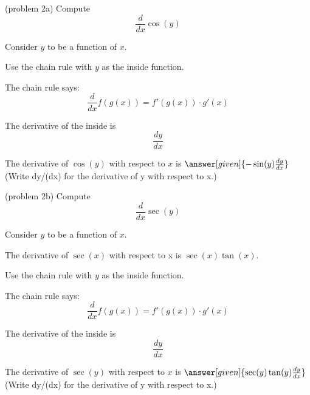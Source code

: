 \documentclass{ximera}
\begin{document}
\begin{problem}(problem 2a)
  Compute
  \[
  \frac{d}{dx} \cos(y)
  \]
  
	  
    \begin{hint}
      Consider $y$ to be a function of $x$.
    \end{hint}
    \begin{hint}
      Use the chain rule with $y$ as the inside function.
    \end{hint}
    \begin{hint}
      The chain rule says:
      \[
      \frac{d}{dx} f(g(x)) = f'(g(x))\cdot g'(x)
      \]
    \end{hint}
    \begin{hint}
      The derivative of the inside is 
      \[
      \frac{dy}{dx}
      \]
    \end{hint}
    
		The derivative of $\cos(y)$ with respect to $x$ is
		 $\answer[given]{-\sin(y) \frac{dy}{dx}}$ (Write dy/(dx) for the derivative of y with respect to x.)
		
\end{problem}

\begin{problem}(problem 2b)
  Compute
  \[
  \frac{d}{dx} \sec(y)
  \]
  
	  
    \begin{hint}
      Consider $y$ to be a function of $x$.
    \end{hint}
    \begin{hint}
     The derivative of $\sec(x)$ with respect to x is $\sec(x)\tan(x)$.
    \end{hint}
		\begin{hint}
      Use the chain rule with $y$ as the inside function.
    \end{hint}
    \begin{hint}
      The chain rule says:
      \[
      \frac{d}{dx} f(g(x)) = f'(g(x))\cdot g'(x)
      \]
    \end{hint}
    \begin{hint}
      The derivative of the inside is 
      \[
      \frac{dy}{dx}
      \]
    \end{hint}
    
		The derivative of $\sec(y)$ with respect to $x$ is
		 $\answer[given]{\sec(y)\tan(y) \frac{dy}{dx}}$ (Write dy/(dx) for the derivative of y with respect to x.)
		
\end{problem}
\end{document}
